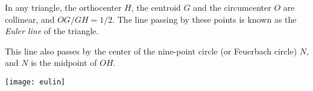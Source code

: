 \documentclass[12pt]{article}
\begin{document}
In any triangle, the orthocenter $H$, the centroid $G$ and the circumcenter $O$ are collinear, and $OG/GH=1/2$. The line passing by these points is known as the \emph{Euler line} of the triangle. 
\medskip

This line also passes by the center of the nine-point circle (or Feuerbach circle) $N$, and $N$ is the midpoint of $OH$.\smallskip

\begin{center}
\texttt{[image: eulin]}
\end{center}
\end{document}
